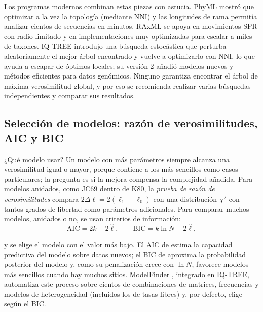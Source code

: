 Los programas modernos combinan estas piezas con astucia. PhyML \parencite{c05-guindon2003} mostró que optimizar a la vez la topología (mediante NNI) y las longitudes de rama permitía analizar cientos de secuencias en minutos. RAxML \parencite{c05-stamatakis2014} se apoya en movimientos SPR con radio limitado y en implementaciones muy optimizadas para escalar a miles de taxones. IQ-TREE \parencite{c05-nguyen2015} introdujo una búsqueda estocástica que perturba aleatoriamente el mejor árbol encontrado y vuelve a optimizarlo con NNI, lo que ayuda a escapar de óptimos locales; su versión 2 \parencite{c05-minh2020} añadió modelos nuevos y métodos eficientes para datos genómicos. Ninguno garantiza encontrar el árbol de máxima verosimilitud global, y por eso se recomienda realizar varias búsquedas independientes y comparar sus resultados.

\subsection{Selección de modelos: razón de verosimilitudes, AIC y BIC}

¿Qué modelo usar? Un modelo con más parámetros siempre alcanza una verosimilitud igual o mayor, porque contiene a los más sencillos como casos particulares; la pregunta es si la mejora compensa la complejidad añadida. Para modelos anidados, como JC69 dentro de K80, la \emph{prueba de razón de verosimilitudes} compara $2\Delta\ell = 2(\ell_1-\ell_0)$ con una distribución $\chi^2$ con tantos grados de libertad como parámetros adicionales. Para comparar muchos modelos, anidados o no, se usan criterios de información:
\begin{equation}\label{eq:05-aic}
\mathrm{AIC} = 2k - 2\hat\ell,\qquad \mathrm{BIC} = k\ln N - 2\hat\ell,
\end{equation}

\begin{simbolos}
\end{simbolos}

\noindent y se elige el modelo con el valor más bajo. El AIC de \textcite{c05-akaike1974} estima la capacidad predictiva del modelo sobre datos nuevos; el BIC de \textcite{c05-schwarz1978} aproxima la probabilidad posterior del modelo y, como su penalización crece con $\ln N$, favorece modelos más sencillos cuando hay muchos sitios. ModelFinder \parencite{c05-kalyaanamoorthy2017}, integrado en IQ-TREE, automatiza este proceso sobre cientos de combinaciones de matrices, frecuencias y modelos de heterogeneidad (incluidos los de tasas libres) y, por defecto, elige según el BIC.

